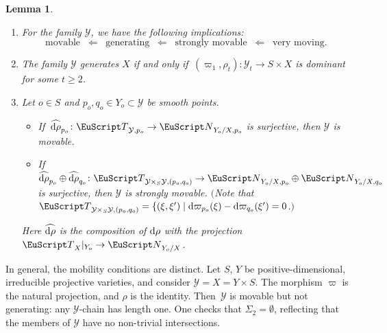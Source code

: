 \documentclass[10pt,a4paper]{article}
\numberwithin{equation}{section}
\newtheorem{m-lemma}[m-theorem]{Lemma}
\theoremstyle{definition}
\theoremstyle{remark}
\let\euf\EuScript %
\let\cal\mathcal
\let\ges\geqslant
\let\vpi\varpi
\newcommand{\rd}{{\rm d}}
\let\rst\vert
\newcommand{\eN}{{\euf N}}
\newcommand{\eT}{{\euf T}}
\newcommand{\cY}{{\cal Y}}
\newcommand{\XX}{X}
\newcommand{\YY}{Y}
\begin{document}
\begin{m-lemma}\label{lm:mov}\leavevmode
\begin{enumerate}
\item\label{l:mov-1} For the family $\cY$, we have the following implications: 
\[
\text{movable} \;\;\Longleftarrow\;\;\text{generating}\;\;\Longleftarrow\;\;\text{strongly movable}\;\;\Longleftarrow\;\;\text{very moving.}
\]
\item\label{iti:Ygen} 
The family $\cY$ generates $\XX$ if and only if\, $(\vpi_1,\rho_t)\colon\cY_t\to S\times\XX$ is dominant for some $t\ges 2$.
\item\label{l:mov-3}  Let $o\in S$ and $p_o,q_o\in\YY_o\subset\cY$ be smooth points.  
\begin{itemize}
\item If\, $\widehat{\rd\rho}_{p_o}\colon \eT_{\cY, p_o} \to \eN_{\YY_o/\XX,p_o}$ is surjective, then $\cY$ is movable. 
\item If\, $\widehat{\rd\rho}_{p_o}\oplus\widehat{\rd\rho}_{q_o}\colon  \eT_{\cY\times_S\cY, (p_o, q_o)} \to\eN_{\YY_o/\XX,p_o}\oplus\eN_{\YY_o/\XX,q_o}$ 
is surjective, then $\cY$ is strongly movable. $($Note that $\eT_{\cY\times_S\cY, (p_o, q_o)}= \{(\xi,\xi')\mid\rd\vpi_{p_o}(\xi)-\rd\vpi_{q_o}(\xi')=0$.$)$
\end{itemize}
Here $\widehat{\rd\rho}$ is the composition of $\rd\rho$ with the projection $\eT_X\rst_{Y_o}\to\eN_{Y_o/X}$. 
\end{enumerate}
\end{m-lemma}

In general, the mobility conditions are distinct. 
Let $S$, $\YY$ be positive-dimensional, irreducible projective varieties, and consider $\cY=\XX=\YY\times S$. The morphism $\varpi$ is the natural projection, and $\rho$ is the identity. Then~$\cY$ is movable but not generating: any $\cY$-chain has length one. One checks that $\Sigma_2=\emptyset$, reflecting that the members of $\cY$ have no non-trivial intersections.
\end{document}
